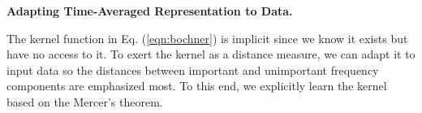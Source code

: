 \documentclass[sigconf,anonymous,review]{acmart}
\begin{document}







\noindent\textbf{Adapting Time-Averaged Representation to Data.}
{\color{black}
The kernel function in Eq. (\ref{eqn:bochner}) is implicit since we know it exists but have no access to it.
To exert the kernel as a distance measure, we can adapt it to input data so the distances between important and unimportant frequency components are emphasized most.
To this end, we explicitly learn the kernel based on the Mercer's theorem.

}
\end{document}
